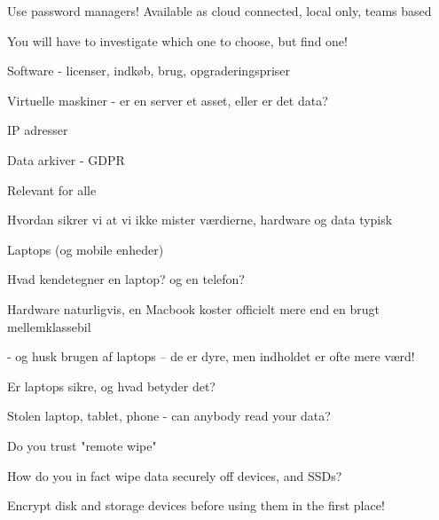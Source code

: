 \documentclass[Screen16to9,17pt]{foils}
\begin{document}


\begin{list2}
\item Use password managers! Available as cloud connected, local only, teams based
\item You will have to investigate which one to choose, but find one!
\end{list2}



\begin{list2}
\item Software - licenser, indkøb, brug, opgraderingspriser
\item Virtuelle maskiner - er en server et asset, eller er det data?
\item IP adresser
\item Data arkiver - GDPR
\end{list2}




\begin{list2}
\item Relevant for alle
\item Hvordan sikrer vi at vi ikke mister værdierne, hardware og data typisk
\end{list2}




\begin{list2}
\item Laptops (og mobile enheder)
\item Hvad kendetegner en laptop? og en telefon?
\item Hardware naturligvis, en Macbook koster officielt mere end en brugt mellemklassebil
\item - og husk brugen af laptops -- de er dyre, men indholdet er ofte mere værd!
\item Er laptops sikre, og hvad betyder det?
\end{list2}





\begin{list1}
\item Stolen laptop, tablet, phone - can anybody read your data?
\item Do you trust "remote wipe"
\item How do you in fact wipe data securely off devices, and SSDs?
\item Encrypt disk and storage devices before using them in the first place!
\end{list1}
\end{document}
